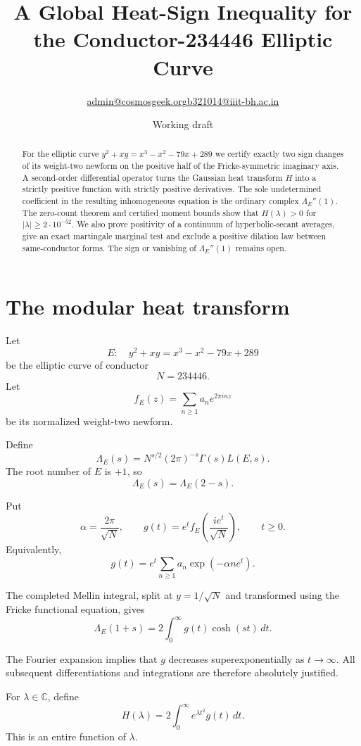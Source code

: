 \documentclass[11pt]{article}
\title{A Global Heat-Sign Inequality for the
Conductor-234446 Elliptic Curve}
\author{\small \href{mailto:admin@cosmosgeek.org}{admin@cosmosgeek.org}\qquad \href{mailto:b321014@iiit-bh.ac.in}{b321014@iiit-bh.ac.in}}
\date{Working draft}
\begin{document}
\maketitle

\begin{abstract}
For the elliptic curve $y^2+xy=x^3-x^2-79x+289$ we certify exactly two
sign changes of its weight-two newform on the positive half of the
Fricke-symmetric imaginary axis. A second-order differential operator
turns the Gaussian heat transform $H$ into a strictly positive function
with strictly positive derivatives. The sole undetermined coefficient
in the resulting inhomogeneous equation is the ordinary complex
$\Lambda_E''(1)$. The zero-count theorem and certified moment bounds
show that $H(\lambda)>0$ for $|\lambda|\ge2\cdot10^{-52}$.
We also prove positivity of a continuum of hyperbolic-secant averages,
give an exact martingale marginal test and exclude a positive dilation
law between same-conductor forms. The sign or vanishing of
$\Lambda_E''(1)$ remains open.
\end{abstract}

\section{The modular heat transform}

Let
\[
E:\quad y^2+xy=x^3-x^2-79x+289
\]
be the elliptic curve of conductor
\[
N=234446.
\]
Let
\[
f_E(z)=\sum_{n\ge1}a_n e^{2\pi inz}
\]
be its normalized weight-two newform.

Define
\[
\Lambda_E(s)=
N^{s/2}(2\pi)^{-s}\Gamma(s)L(E,s).
\]
The root number of $E$ is $+1$, so
\[
\Lambda_E(s)=\Lambda_E(2-s).
\]

Put
\[
\alpha=\frac{2\pi}{\sqrt N},
\qquad
g(t)=e^t f_E\left(\frac{ie^t}{\sqrt N}\right),
\qquad t\ge0.
\]
Equivalently,
\[
g(t)=e^t\sum_{n\ge1}a_n
             \exp(-\alpha n e^t).
\]

The completed Mellin integral, split at
$y=1/\sqrt N$ and transformed using the Fricke
functional equation, gives
\begin{equation}
\Lambda_E(1+s)
=2\int_0^\infty g(t)\cosh(st)\,dt.
\label{eq:mellin}
\end{equation}

The Fourier expansion implies that $g$ decreases
superexponentially as $t\to\infty$.
All subsequent differentiations and integrations
are therefore absolutely justified.

For $\lambda\in\mathbb C$, define
\begin{equation}
H(\lambda)=
2\int_0^\infty e^{\lambda t^2}g(t)\,dt.
\label{eq:heat}
\end{equation}
This is an entire function of $\lambda$.
\end{document}
